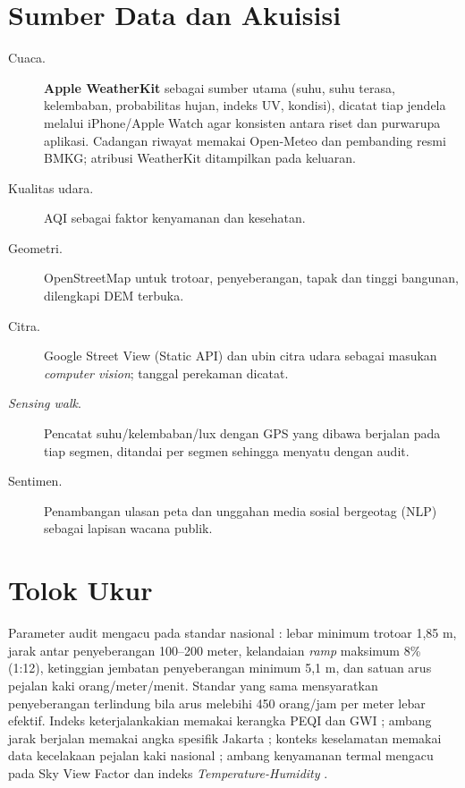\documentclass[11pt,a4paper]{report}
\begin{document}
\section{Sumber Data dan Akuisisi}
\begin{description}
  \item[Cuaca.] \textbf{Apple WeatherKit} sebagai sumber utama (suhu, suhu terasa, kelembaban,
    probabilitas hujan, indeks UV, kondisi), dicatat tiap jendela melalui iPhone/Apple Watch agar
    konsisten antara riset dan purwarupa aplikasi. Cadangan riwayat memakai Open-Meteo dan
    pembanding resmi BMKG; atribusi WeatherKit ditampilkan pada keluaran.
  \item[Kualitas udara.] AQI sebagai faktor kenyamanan dan kesehatan.
  \item[Geometri.] OpenStreetMap untuk trotoar, penyeberangan, tapak dan tinggi bangunan,
    dilengkapi DEM terbuka.
  \item[Citra.] Google Street View (Static API) dan ubin citra udara sebagai masukan
    \emph{computer vision}; tanggal perekaman dicatat.
  \item[\textit{Sensing walk}.] Pencatat suhu/kelembaban/lux dengan GPS yang dibawa berjalan pada
    tiap segmen, ditandai per segmen sehingga menyatu dengan audit.
  \item[Sentimen.] Penambangan ulasan peta dan unggahan media sosial bergeotag (NLP) sebagai
    lapisan wacana publik.
\end{description}

\section{Tolok Ukur}
Parameter audit mengacu pada standar nasional \autocite{binamarga2023}: lebar minimum trotoar
1,85 m, jarak antar penyeberangan 100--200 meter, kelandaian \textit{ramp} maksimum 8\% (1:12),
ketinggian jembatan penyeberangan minimum 5,1 m, dan satuan arus pejalan kaki orang/meter/menit.
Standar yang sama mensyaratkan penyeberangan terlindung bila arus melebihi 450 orang/jam per meter
lebar efektif. Indeks keterjalankakian memakai kerangka PEQI dan GWI
\autocite{dwisadana2024,mulyadi2022}; ambang jarak berjalan memakai angka spesifik Jakarta
\autocite{afkara2020walking}; konteks keselamatan memakai data kecelakaan pejalan kaki nasional
\autocite{korlantas2023}; ambang kenyamanan termal mengacu pada Sky View Factor dan indeks
\emph{Temperature-Humidity} \autocite{arif2021skyview}.
\end{document}
